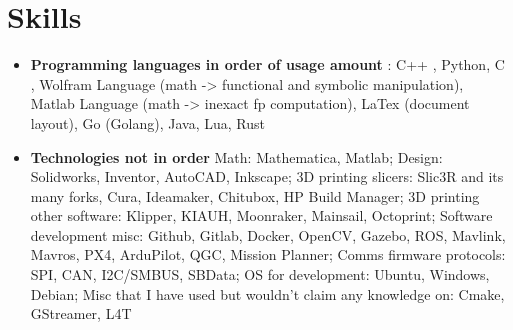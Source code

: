 \documentclass[letterpaper,10pt]{article}
\newcommand{\resumeSubHeadingListStart}{\begin{itemize}[leftmargin=*]}
\newcommand{\resumeSubHeadingListEnd}{\end{itemize}}
\newcommand{\shorterSection}[1]{\vspace{-10pt}\section{#1}}
\begin{document}
\shorterSection{Skills}
  \resumeSubHeadingListStart
  \small
    \item{
     \textbf{Programming languages in order of usage amount }{: C++ , Python, C , Wolfram Language (math -> functional and symbolic manipulation),  Matlab Language (math -> inexact fp computation), LaTex (document layout), Go (Golang), Java, Lua, Rust }}
     \item{
     \textbf{Technologies not in order}{ Math: Mathematica, Matlab; Design: Solidworks, Inventor, AutoCAD, Inkscape; 3D printing slicers: Slic3R and its many forks, Cura, Ideamaker, Chitubox, HP Build Manager; 3D printing other software: Klipper, KIAUH, Moonraker, Mainsail, Octoprint; Software development misc: Github, Gitlab, Docker, OpenCV, Gazebo, ROS, Mavlink, Mavros, PX4, ArduPilot, QGC, Mission Planner; Comms firmware protocols: SPI, CAN, I2C/SMBUS, SBData; OS for development: Ubuntu, Windows, Debian; Misc that I have used but wouldn't claim any knowledge on: Cmake, GStreamer, L4T}
    }
\resumeSubHeadingListEnd
\end{document}
